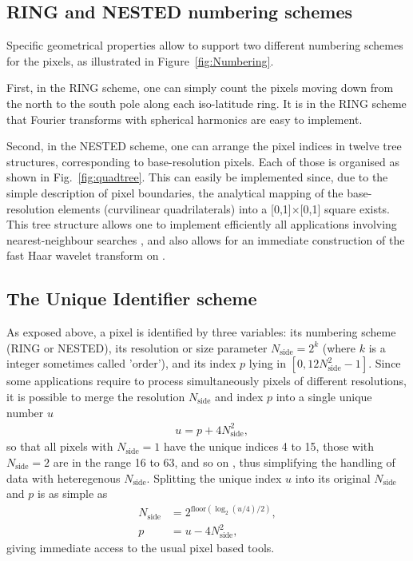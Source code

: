 \documentclass[12pt,twoside]{article}
\makeatletter
\newcommand{\myhtmlimage}[1]{ }
\newcommand{\myequal}{=}
\renewcommand{\myequal}{=} %
\newcommand{\nop}[1]{\Hy@raisedlink{\hypertarget{#1}{}}}
\newcommand{\mytarget}[1]{\nop{#1}}%
\newcommand{\mytarget}[1]{\label{#1}}
\newcommand{\nside}{N_{\mathrm{side}}}
\makeatother
\begin{document}
\subsection{RING and NESTED numbering schemes}
Specific geometrical properties allow \healpix to support two different
numbering schemes for the pixels, as illustrated in Figure~\ref{fig:Numbering}. 

First, in the RING scheme, 
one can simply count the pixels moving down from the north 
to the south pole along each
iso-latitude ring. It is in the RING scheme that Fourier transforms 
with spherical harmonics
are easy to implement.

Second, in the NESTED scheme, one can arrange the pixel indices 
in  twelve tree structures, corresponding to base-resolution pixels.
Each of those is organised as shown in Fig.~\ref{fig:quadtree}. %
This can easily be implemented
since, due to the simple 
description of pixel boundaries, the analytical mapping of the \healpix
base-resolution elements (curvilinear
quadrilaterals) into a [0,1]$\times$[0,1] square exists.
This tree structure allows one to implement efficiently all
applications involving  nearest-neighbour searches
\citep{whg},
and also allows for an immediate
construction of the fast Haar wavelet transform on \healpixns. 

\subsection{The Unique Identifier scheme}
\label{intro:unique}
As exposed above, a \healpix pixel is identified by three variables:
its numbering scheme (RING or NESTED), 
its resolution or size parameter $\nside = 2^k$ (where $k$ is a integer sometimes called 'order'),
and its index $p$ lying in $[0, 12\nside^2-1]$.
Since some applications require to process simultaneously pixels of different resolutions, it is possible
to merge the resolution $\nside$ and index $p$ into a single unique number $u$
\begin{align}
	& u = p + 4 \nside^2, \myhtmlimage{} \label{eq:nest2uniq}
\end{align}
so that all pixels with $\nside=1$ have the unique indices 4 to 15, 
those with $\nside=2$ are in the range 16 to 63, and so on \citep{rh15}, 
thus simplifying the handling of data with heteregenous $\nside$.
Splitting the unique index $u$ into its original $\nside$ and $p$ is as simple as
\begin{align}
	\nside &= 2^{\mathrm{floor}\left( \log_2(u/4)/2 \right)}, \myhtmlimage{} \label{eq:ring2nest_a}\\
	     p &= u - 4 \nside^2, \myhtmlimage{} \label{eq:ring2nest_b}
\end{align}
giving immediate access to the usual pixel based tools.
\end{document}
